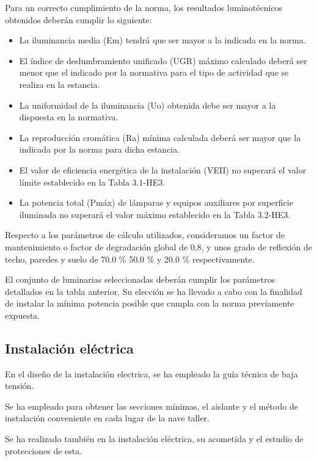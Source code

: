 \documentclass[../main.tex]{subfiles}
\begin{document}
Para un correcto cumplimiento de la norma, los resultados luminotécnicos obtenidos deberán cumplir lo siguiente:

\begin{itemize}
    \item La iluminancia media (Em) tendrá que ser mayor a la indicada en la norma.
    \item El índice de deslumbramiento unificado (UGR) máximo calculado deberá ser menor que el indicado por la normativa para el tipo de actividad que se realiza en la estancia.
    \item La uniformidad de la iluminancia (Uo) obtenida debe ser mayor a la dispuesta en la normativa.
    \item La reproducción cromática (Ra) mínima calculada deberá ser mayor que la indicada por la norma para dicha estancia.
    \item El valor de eficiencia energética de la instalación (VEII) no superará el valor límite establecido en la Tabla 3.1-HE3.
    \item La potencia total (Pmáx) de lámparas y equipos auxiliares por superficie iluminada no superará el valor máximo establecido en la Tabla 3.2-HE3.
\end{itemize}

Respecto a los parámetros de cálculo utilizados, consideramos un factor de mantenimiento o factor de degradación global de 0,8, y unos grado de reflexión de techo, paredes y suelo de 70.0 \% 50.0 \% y 20.0 \% respectivamente. \par
\vspace{0.5 cm}
El conjunto de luminarias seleccionadas deberán cumplir los parámetros detallados en la tabla anterior. Su elección se ha llevado a cabo con la finalidad de instalar la mínima potencia posible que cumpla con la norma previamente expuesta.\par

\subsection{Instalación eléctrica}

En el diseño de la instalación electrica, se ha empleado la guía técnica de baja tensión.

Se ha empleado para obtener las secciones mínimas, el aislante y el método de instalación conveniente en cada lugar de la nave taller. 

Se ha realizado también en la instalación eléctrica, su acometida y el estudio de protecciones de esta.
\end{document}
